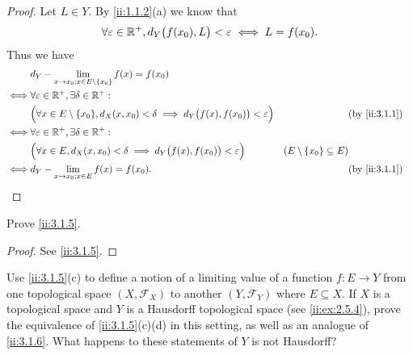 \begin{proof}
  Let \(L \in Y\).
  By \cref{ii:1.1.2}(a) we know that
  \[
    \forall \varepsilon \in \mathbb{R}^+, d_Y\big(f(x_0), L\big) < \varepsilon \iff L = f(x_0).
  \]
  Thus we have
  \begin{align*}
         & d_Y - \lim_{x \to x_0 ; x \in E \setminus \set{x_0}} f(x) = f(x_0)                                                                                                         \\
    \iff & \forall \varepsilon \in \R^+, \exists \delta \in \R^+ :                                                                                                                    \\
         & \Big(\forall x \in E \setminus \set{x_0}, d_X(x, x_0) < \delta \implies d_Y\big(f(x), f(x_0)\big) < \varepsilon\Big) &                                     & \by{ii:3.1.1} \\
    \iff & \forall \varepsilon \in \R^+, \exists \delta \in \R^+ :                                                                                                                    \\
         & \Big(\forall x \in E, d_X(x, x_0) < \delta \implies d_Y\big(f(x), f(x_0)\big) < \varepsilon\Big)                     & (E \setminus \set{x_0} \subseteq E)                 \\
    \iff & d_Y - \lim_{x \to x_0 ; x \in E} f(x) = f(x_0).                                                                      &                                     & \by{ii:3.1.1}
  \end{align*}
\end{proof}

\begin{ex}\label{ii:ex:3.1.2}
  Prove \cref{ii:3.1.5}.
\end{ex}

\begin{proof}
  See \cref{ii:3.1.5}.
\end{proof}

\begin{ex}\label{ii:ex:3.1.3}
  Use \cref{ii:3.1.5}(c) to define a notion of a limiting value of a function \(f : E \to Y\) from one topological space \((X, \mathcal{F}_X)\) to another \((Y, \mathcal{F}_Y)\) where \(E \subseteq X\).
  If \(X\) is a topological space and \(Y\) is a Hausdorff topological space (see \cref{ii:ex:2.5.4}), prove the equivalence of \cref{ii:3.1.5}(c)(d) in this setting, as well as an analogue of \cref{ii:3.1.6}.
  What happens to these statements of \(Y\) is not Hausdorff?
\end{ex}

